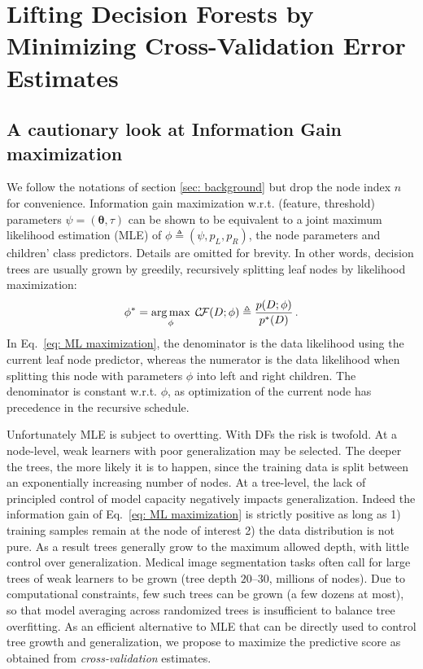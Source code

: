 
\section{Lifting Decision Forests by Minimizing Cross-Validation Error Estimates}
\label{sec: lifting}

\subsection{A cautionary look at Information Gain maximization}

We follow the notations of section \ref{sec: background} but drop the node index $n$ for convenience. Information gain maximization w.r.t. (feature, threshold) parameters $\psi=(\bm{\theta},\tau)$ can be shown to be equivalent to a joint maximum likelihood estimation (MLE) of $\phi\!\triangleq\!(\psi,p_L,p_R)$, the node parameters and children' class predictors. Details are omitted for brevity. In other words, decision trees are usually grown by greedily, recursively splitting leaf nodes by likelihood maximization:
\begin{equation}
\phi^\ast = \operatorname*{arg\,max}_{\phi} \; \mathcal{C}\!\mathcal{F}(D;\phi) \triangleq \frac{p(D;\phi)}{p^\ast(D)} \, .
\label{eq: ML maximization}
\end{equation}
In Eq.~\eqref{eq: ML maximization}, the denominator is the data likelihood using the current leaf node predictor, whereas the numerator is the data likelihood when splitting this node with parameters $\phi$ into left and right children. The denominator is constant w.r.t. $\phi$, as optimization of the current node has precedence in the recursive schedule. 

Unfortunately MLE is subject to overtting. With DFs the risk is twofold. At a node-level, weak learners with poor generalization may be selected. The deeper the trees, the more likely it is to happen, since the training data is split between an exponentially increasing number of nodes. At a tree-level, the lack of principled control of model capacity negatively impacts generalization. Indeed the information gain of Eq.~\eqref{eq: ML maximization} is strictly positive as long as 1) training samples remain at the node of interest 2) the data distribution is not pure. As a result trees generally grow to the maximum allowed depth, with little control over generalization. Medical image segmentation tasks often call for large trees of weak learners to be grown (tree depth $20$--$30$, millions of nodes). Due to computational constraints, few such trees can be grown (a few dozens at most), so that model averaging across randomized trees is insufficient to balance tree overfitting. As an efficient alternative to MLE that can be directly used to control tree growth and generalization, we propose to maximize the predictive score as obtained from \textit{cross-validation} estimates.

